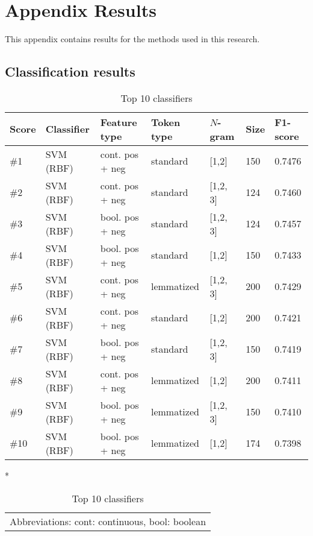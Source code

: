 
\chapter{Appendix Results}\label{ch:appendixResult}
This appendix contains results for the methods used in this research.
\section{Classification results}
\vspace{-1em}

\begin{table}[H]
\begin{tabular}{|l|l|l|l|l|l|l|}
\hline
Score & Classifier & Feature type & Token type & $N$-gram & Size & F1-score\\
\hline
\#1 & SVM (RBF) & cont. pos + neg  & standard  & [1,2]  & 150 & 0.7476\\
\#2 & SVM (RBF) & cont. pos + neg  & standard  & [1,2, 3] &  124 & 0.7460 \\
\#3 & SVM (RBF) & bool. pos + neg  &  standard  & [1,2, 3] &   124 & 0.7457   \\
\#4 & SVM (RBF) & bool. pos + neg  & standard  & [1,2] &   150 & 0.7433   \\
\#5 & SVM (RBF) & cont. pos + neg  & lemmatized  &  [1,2, 3]  &  200 & 0.7429\\
\#6 & SVM (RBF) & cont. pos + neg & standard   & [1,2]  & 200 & 0.7421\\ 
\#7 & SVM (RBF) & bool. pos + neg &  standard  & [1,2, 3]  & 150 & 0.7419\\
\#8 & SVM (RBF) & cont. pos + neg & lemmatized  & [1,2]  &  200 & 0.7411 \\
\#9 & SVM (RBF) & bool. pos + neg & lemmatized  &  [1,2, 3]  &  150 & 0.7410\\
\#10 & SVM (RBF) & bool. pos + neg & lemmatized  & [1,2]  & 174 & 0.7398 \\  

\hline
\end{tabular}
\caption{Top 10 classifiers}*{
   \begin{tabular}{c}
   	Abbreviations:
   cont: continuous, bool: boolean\\
   \end{tabular}
 }
\label{table:top10_clf}
\end{table}
\vspace{-1em}
